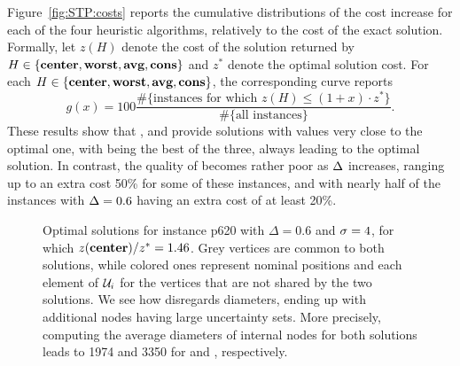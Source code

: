 \documentclass[12pt]{article}
\newcommand{\blue}[1]{{\color{black}#1}}
\begin{document}





Figure~\ref{fig:STP:costs} reports the cumulative distributions of the cost increase for each of the four heuristic algorithms, relatively to the cost of the exact solution. Formally, let $z(H)$ denote the cost of the solution returned by $H\in\{\textbf{center}{},\textbf{worst}{},\textbf{avg}{},\textbf{cons}{}\}$ and $z^*$ denote the optimal solution cost. 
For each $H\in\{\textbf{center}{},\textbf{worst}{},\textbf{avg}{},\textbf{cons}{}\}$, the corresponding curve reports
\begin{equation}
 \label{eq:costcurves}
g(x) = 100\frac{\#\{\mbox{instances for which $z(H)\leq (1+x)\cdot z^*$}\}}{\#\{\mbox{all instances}\}}.
\end{equation}
These results show that \worst{}, \avg{} and \cons{} provide solutions with values very close to the optimal one, with \cons{} being the best of the three, always leading to the optimal solution. In contrast, the quality of \hcenter{} becomes rather poor as $\Delta$ increases, ranging up to an extra cost 50\% for some of these instances, and with nearly half of the instances with $\Delta=0.6$ having an extra cost of at least 20\%. 

\begin{figure}
 \centering
{}
\caption{\blue{Optimal solutions for instance p620 with $\Delta=0.6$ and ${\sigma_{}}=4$, for which $z(\textbf{center}{})/z^*=1.46$. Grey vertices are common to both solutions, while colored ones represent nominal positions and each element of $\mathcal{U}_i$ for the vertices that are not shared by the two solutions. We see how \hcenter{} disregards diameters, ending up with additional nodes having large uncertainty sets. More precisely, computing the average diameters of internal nodes for both solutions leads to 1974 and 3350 for \exact{} and \hcenter{}, respectively.}}
\label{fig:exres}
\end{figure}
\end{document}
